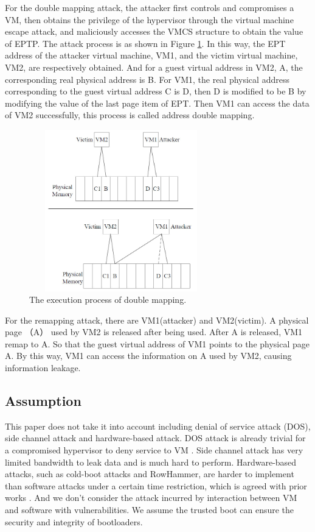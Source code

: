 \documentclass[conference]{IEEEtran}
\begin{document}
For the double mapping attack, the attacker first controls and compromises a VM, then obtains the privilege of the hypervisor through the virtual machine escape attack, and maliciously accesses the VMCS structure to obtain the value of EPTP. The attack process is as shown in Figure \ref{fig0}. In this way, the EPT address of the attacker virtual machine, VM1, and the victim virtual machine, VM2, are respectively obtained. And for a guest virtual address in VM2, A, the corresponding real physical address is B. For VM1, the real physical address corresponding to the guest virtual address C is D, then D is modified to be B by modifying the value of the last page item of EPT. Then VM1 can access the data of VM2 successfully, this process is called address double mapping.

\begin{figure}
\centerline{\includegraphics[width=8cm, height=7cm]{VMCS0.jpg}}%
\caption{The execution process of double mapping. } \label{fig0}
\end{figure}

For the remapping attack, there are VM1(attacker) and VM2(victim). A physical page （A） used by VM2 is released after being used. After A is released, VM1 remap to A. So that the guest virtual address of VM1 points to the physical page A. By this way, VM1 can access the information on A used by VM2, causing information leakage.

\subsection{Assumption}
This paper does not take it into account including denial of service attack (DOS), side channel attack and hardware-based attack. DOS attack is already trivial for a compromised hypervisor to deny service to VM \cite{Wang2015DDoS}. Side channel attack has very limited bandwidth to leak data and is much hard to perform. Hardware-based attacks, such as cold-boot attacks and RowHammer, are harder to implement than software attacks under a certain time restriction, which is agreed with prior works \cite{Zhang2011CloudVisor}. And we don't consider the attack incurred by interaction between VM and software with vulnerabilities. We assume the trusted boot can ensure the security and integrity of bootloaders.
\end{document}
